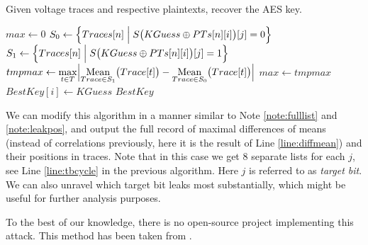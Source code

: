 	\begin{alg}
	\label{alg:bitwisedpa}
	Given voltage traces and respective plaintexts, recover the AES key.
		\begin{algorithmic}[1]
					\State $max \gets 0$
						 \label{line:tbcycle}
							\State $S_0 \gets \Bigl\{ Traces[n] \Bigm| S\bigl(KGuess\oplus PTs[n][i]\bigr)[j] = 0 \Bigr\}$ \label{line:s0}
							\State $S_1 \gets \Bigl\{ Traces[n] \Bigm| S\bigl(KGuess\oplus PTs[n][i]\bigr)[j] = 1 \Bigr\}$ \label{line:s1}
							\State $tmpmax \gets \max\limits_{t\in T} \Bigl| \operatorname*{Mean}\limits_{Trace\in S_1}\bigl(Trace[t]\bigr) - \operatorname*{Mean}\limits_{Trace\in S_0}\bigl(Trace[t]\bigr) \Bigr|$
								\label{line:diffmean}
								\State $max \gets tmpmax$
								\State $BestKey[i] \gets KGuess$
							\EndIf
						\EndFor
					\EndFor
				\EndFor
				\State\Return $BestKey$
			\EndFunction
		\end{algorithmic}
	\end{alg}
	
	\begin{note}
	\label{note:eightlists}
		We can modify this algorithm in a manner similar to Note \ref{note:fulllist} and \ref{note:leakpos}, and output the full record of maximal differences of means (instead of correlations previously, here it is the result of Line \ref{line:diffmean}) and their positions in traces. Note that in this case we get $8$ separate lists for each $j$, see Line \ref{line:tbcycle} in the previous algorithm. Here $j$ is referred to as {\em target bit}. We can also unravel which target bit leaks most substantially, which might be useful for further analysis purposes.
	\end{note}
	
	To the best of our knowledge, there is no open-source project implementing this attack. This method has been taken from \cite{teuwen2015movfuscator}.
	